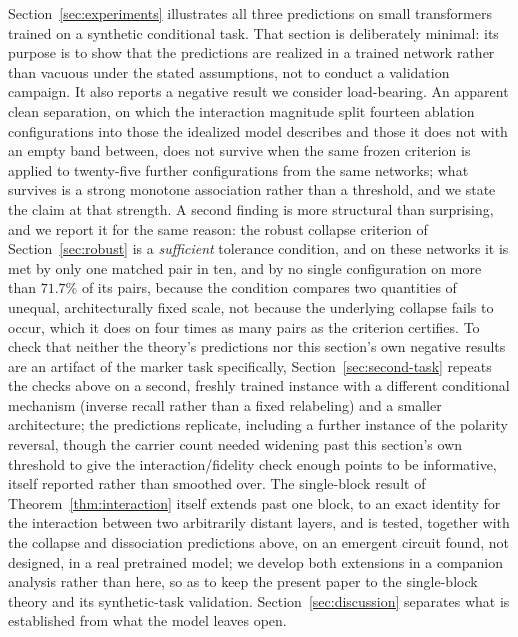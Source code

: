 \documentclass[11pt,a4paper]{article}
\begin{document}
\medskip
Section~\ref{sec:experiments} illustrates all three predictions on small
transformers trained on a synthetic conditional task. That section is
deliberately minimal: its purpose is to show that the predictions are
realized in a trained network rather than vacuous under the stated
assumptions, not to conduct a validation campaign. It also reports a negative
result we consider load-bearing. An apparent clean separation, on which the
interaction magnitude split fourteen ablation configurations into those the
idealized model describes and those it does not with an empty band between,
does not survive when the same frozen criterion is applied to twenty-five
further configurations from the same networks; what survives is a strong
monotone association rather than a threshold, and we state the claim at that
strength. A second finding is more structural than surprising, and we report
it for the same reason: the robust collapse criterion of
Section~\ref{sec:robust} is a \emph{sufficient} tolerance condition, and on
these networks it is met by only one matched pair in ten, and by no single
configuration on more than $71.7\%$ of its pairs, because the condition
compares two quantities of unequal, architecturally fixed scale, not because
the underlying collapse fails to occur, which it does on four times as many
pairs as the criterion certifies. To check that neither the theory's
predictions nor this section's own negative results are an artifact of the
marker task specifically, Section~\ref{sec:second-task} repeats the checks
above on a second, freshly trained instance with a different conditional
mechanism (inverse recall rather than a fixed relabeling) and a smaller
architecture; the predictions replicate, including a further instance of the
polarity reversal, though the carrier count needed widening past this
section's own threshold to give the interaction/fidelity check enough points
to be informative, itself reported rather than smoothed over.
The single-block result of Theorem~\ref{thm:interaction} itself extends past
one block, to an exact identity for the interaction between two arbitrarily
distant layers, and is tested, together with the collapse and dissociation
predictions above, on an emergent circuit found, not designed, in a real
pretrained model; we develop both extensions in a companion analysis rather
than here, so as to keep the present paper to the single-block theory and its
synthetic-task validation.
Section~\ref{sec:discussion} separates what is established from what the
model leaves open.

\end{document}
